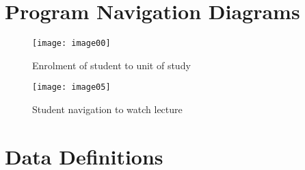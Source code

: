 \documentclass{article}
\begin{document}
\clearpage
\section{Program Navigation Diagrams}
\begin{figure}[h!]
\centering
\texttt{[image: image00]}
\caption{Enrolment of student to unit of study}
\end{figure}

\begin{figure}[h!]
\centering
\texttt{[image: image05]}
\caption{Student navigation to watch lecture}
\end{figure}

\clearpage
\section{Data Definitions}
\end{document}
